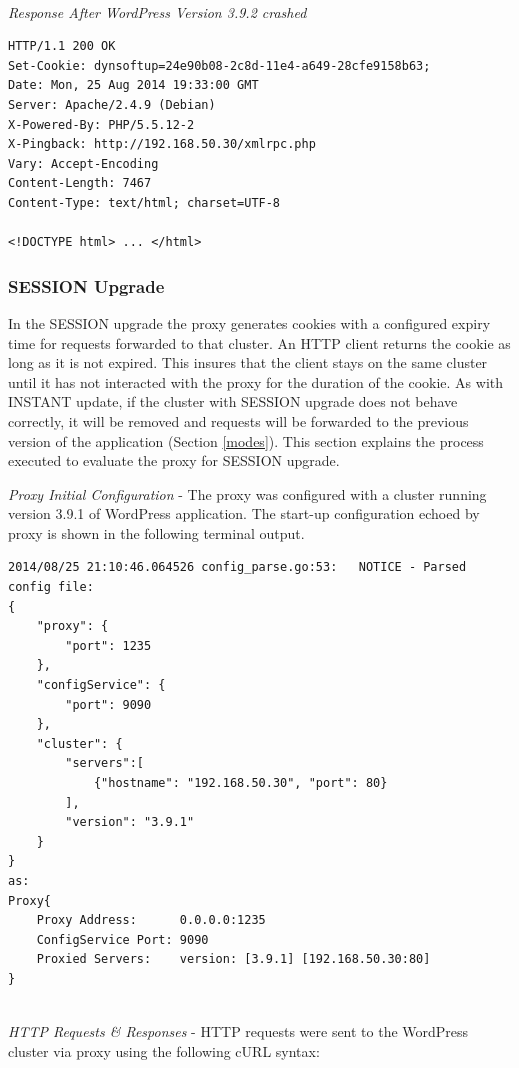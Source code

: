 \documentclass[a4paper,11pt,twoside]{report}
\begin{document}
\noindent\\
\textit{Response After WordPress Version 3.9.2 crashed}
\begin{lstlisting}[language=terminal]
HTTP/1.1 200 OK
Set-Cookie: dynsoftup=24e90b08-2c8d-11e4-a649-28cfe9158b63;
Date: Mon, 25 Aug 2014 19:33:00 GMT
Server: Apache/2.4.9 (Debian)
X-Powered-By: PHP/5.5.12-2
X-Pingback: http://192.168.50.30/xmlrpc.php
Vary: Accept-Encoding
Content-Length: 7467
Content-Type: text/html; charset=UTF-8

<!DOCTYPE html> ... </html>  
\end{lstlisting}
   
\subsubsection*{SESSION Upgrade}
In the SESSION upgrade the proxy generates cookies with a configured expiry time for requests forwarded to that cluster. An HTTP client returns the cookie as long as it is not expired. This insures that the client stays on the same cluster until it has not interacted with the proxy for the duration of the cookie. As with INSTANT update, if the cluster with SESSION upgrade does not behave correctly, it will be removed and requests will be forwarded to the previous version of the application (Section \ref{modes}). This section explains the process executed to evaluate the proxy for SESSION upgrade.\medskip

\noindent
\textit{Proxy Initial Configuration} - The proxy was configured with a cluster running version 3.9.1 of WordPress application. The start-up configuration echoed by proxy is shown in the following terminal output.\smallskip

\begin{lstlisting}[language=terminal]
2014/08/25 21:10:46.064526 config_parse.go:53:   NOTICE - Parsed config file:
{
    "proxy": {
        "port": 1235
    },
    "configService": {
        "port": 9090
    },
    "cluster": {
        "servers":[
            {"hostname": "192.168.50.30", "port": 80}
        ],
        "version": "3.9.1"
    }
}
as:
Proxy{
	Proxy Address:      0.0.0.0:1235
	ConfigService Port: 9090
	Proxied Servers:    version: [3.9.1] [192.168.50.30:80]
}
\end{lstlisting}

\noindent \\
\textit{HTTP Requests \& Responses} - HTTP requests were sent to the WordPress cluster via proxy using the following cURL syntax:\smallskip  
\end{document}
